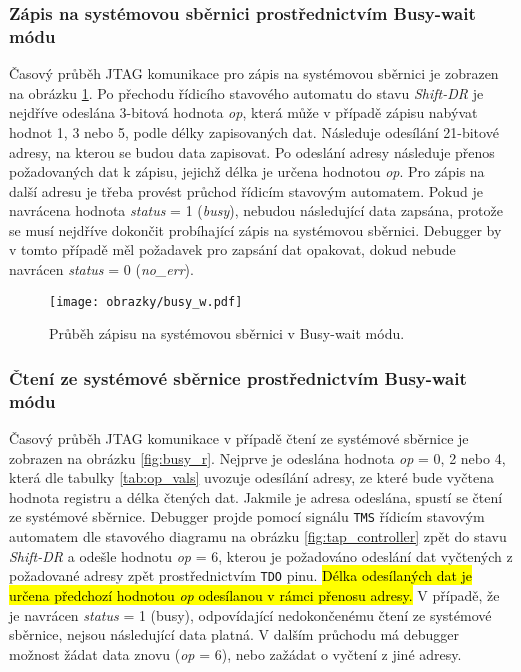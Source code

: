 \subsubsection{Zápis na systémovou sběrnici prostřednictvím Busy-wait módu} 
Časový průběh JTAG komunikace pro zápis na systémovou sběrnici je zobrazen na obrázku \ref{fig:busy_w}. Po přechodu řídicího stavového automatu do stavu \textit{Shift-DR} je nejdříve odeslána 3-bitová hodnota \textit{op}, která může v případě zápisu nabývat hodnot 1, 3 nebo 5, podle délky zapisovaných dat. Následuje odesílání 21-bitové adresy, na kterou se budou data zapisovat. Po odeslání adresy následuje přenos požadovaných dat k zápisu, jejichž délka je určena hodnotou \textit{op}. Pro zápis na další adresu je třeba provést průchod řídicím stavovým automatem. Pokud je navrácena hodnota \textit{status} = 1 (\textit{busy}), nebudou následující data zapsána, protože se musí nejdříve dokončit probíhající zápis na systémovou sběrnici. Debugger by v tomto případě měl požadavek pro zapsání dat opakovat, dokud nebude navrácen \textit{status} = 0 (\textit{no\_err}).

\begin{figure}[H]
  \begin{center}
    \texttt{[image: obrazky/busy\_w.pdf]}
  \end{center}
  \caption{Průběh zápisu na systémovou sběrnici v Busy-wait módu.}
	\label{fig:busy_w}
\end{figure}

\subsubsection{Čtení ze systémové sběrnice prostřednictvím Busy-wait módu} 
Časový průběh JTAG komunikace v případě čtení ze systémové sběrnice je zobrazen na obrázku \ref{fig:busy_r}. Nejprve je odeslána hodnota \textit{op} = 0, 2 nebo 4, která dle tabulky \ref{tab:op_vals} uvozuje odesílání adresy, ze které bude vyčtena hodnota registru a délka čtených dat. Jakmile je adresa odeslána, spustí se čtení ze systémové sběrnice. Debugger projde pomocí signálu \texttt{\acs{TMS}} řídicím stavovým automatem dle stavového diagramu na obrázku \ref{fig:tap_controller} zpět do stavu \textit{Shift-DR} a odešle hodnotu \textit{op} = 6, kterou je požadováno odeslání dat vyčtených z požadované adresy zpět prostřednictvím \texttt{\acs{TDO}} pinu. \hl{Délka odesílaných dat je určena předchozí hodnotou \textit{op} odesílanou v rámci přenosu adresy.} V případě, že je navrácen \textit{status} = 1 (busy), odpovídající nedokončenému čtení ze systémové sběrnice, nejsou následující data platná. V dalším průchodu má debugger možnost žádat data znovu (\textit{op} = 6), nebo zažádat o vyčtení z jiné adresy.

